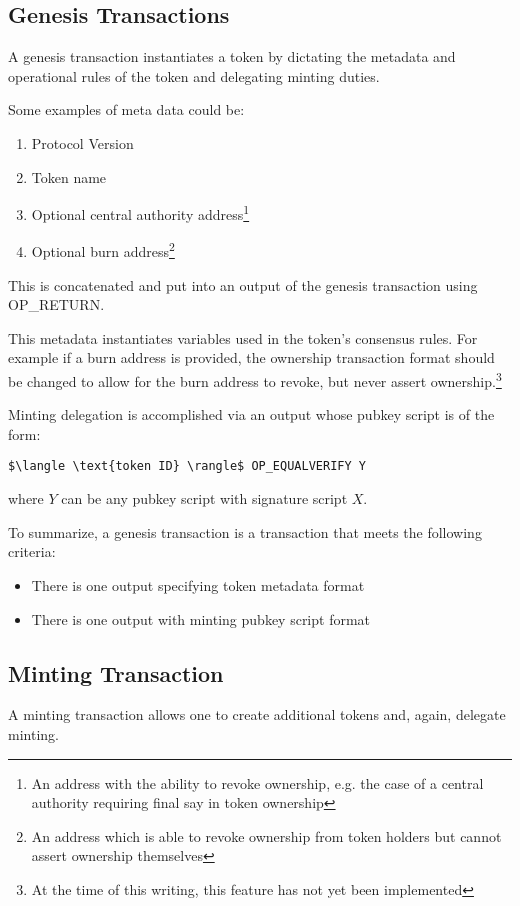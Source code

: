 \documentclass[9pt,oneside]{amsart}
\begin{document}
\begin{multicols}{2}
\subsection{Genesis Transactions}\label{subsec:gentrans}
A genesis transaction instantiates a token by dictating the metadata and operational rules of the token and delegating minting duties.

Some examples of meta data could be:
\begin{enumerate}
	\item Protocol Version
    \item Token name
	\item Optional central authority address\footnote{An address with the ability to revoke ownership, e.g. the case of a central authority requiring final say in token ownership}
    \item Optional burn address\footnote{An address which is able to revoke ownership from token holders but cannot assert ownership themselves}
\end{enumerate}
This is concatenated and put into an output of the genesis transaction using OP\_RETURN.

This metadata instantiates variables used in the token's consensus rules. For example if a burn address is provided, the ownership transaction format should be changed to allow for the burn address to revoke, but never assert ownership.\footnote{At the time of this writing, this feature has not yet been implemented}

Minting delegation is accomplished via an output whose pubkey script is of the form:

\begin{lstlisting}[title={\textbf{Minting PubKey Script}}]
$\langle \text{token ID} \rangle$ OP_EQUALVERIFY Y
\end{lstlisting}
where $Y$ can be any pubkey script with signature script $X$.

To summarize, a genesis transaction is a transaction that meets the following criteria:
\begin{itemize}
    \item There is one output specifying token metadata format
    \item There is one output with minting pubkey script format
\end{itemize}

\subsection{Minting Transaction}
A minting transaction allows one to create additional tokens and, again, delegate minting.


\end{multicols}
\end{document}
